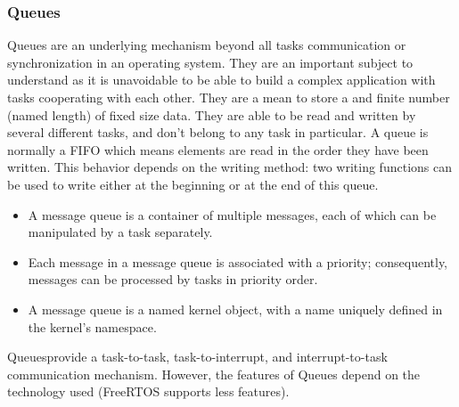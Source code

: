 \subsubsection{Queues}
Queues are an underlying mechanism beyond all tasks communication or synchronization in an operating system.
They are an important subject to understand as it is unavoidable to be able to build a complex application with tasks cooperating with each other.
They are a mean to store a and finite number (named \glqq{}length\grqq) of fixed size data.
They are able to be read and written by several different tasks, and don't belong to any task in particular.
A queue is normally a FIFO which means elements are read in the order they have been written.
This behavior depends on the writing method: two writing functions can be used to write either at the beginning or at the end of this queue.
\begin{itemize}
	\item A message queue is a container of multiple messages, each of which can be manipulated by a task separately.
	\item Each message in a message queue is associated with a priority; consequently, messages can be processed by tasks in priority order.
	\item A message queue is a named kernel object, with a name uniquely defined in the kernel’s namespace.
\end{itemize}
\glqq{}Queues\grqq provide a task-to-task, task-to-interrupt, and interrupt-to-task communication mechanism.
However, the features of Queues depend on the technology used (FreeRTOS supports less features).

